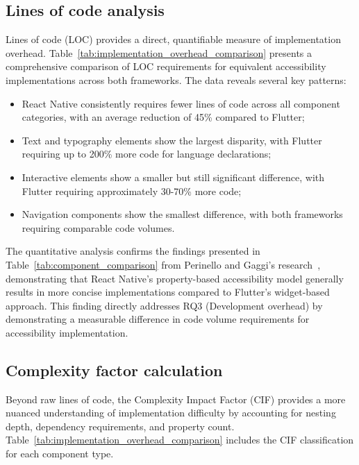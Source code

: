 \subsection{Lines of code analysis}
\label{subsec:loc-analysis}

Lines of code (LOC) provides a direct, quantifiable measure of implementation overhead. Table~\ref{tab:implementation_overhead_comparison} presents a comprehensive comparison of LOC requirements for equivalent accessibility implementations across both frameworks. The data reveals several key patterns:

\begin{itemize}
    \item React Native consistently requires fewer lines of code across all component categories, with an average reduction of 45\% compared to Flutter;
    \item Text and typography elements show the largest disparity, with Flutter requiring up to 200\% more code for language declarations;
    \item Interactive elements show a smaller but still significant difference, with Flutter requiring approximately 30-70\% more code;
    \item Navigation components show the smallest difference, with both frameworks requiring comparable code volumes.
\end{itemize}

The quantitative analysis confirms the findings presented in Table~\ref{tab:component_comparison} from Perinello and Gaggi's research~\cite{perinello2024accessibility}, demonstrating that React Native's property-based accessibility model generally results in more concise implementations compared to Flutter's widget-based approach. This finding directly addresses RQ3 (Development overhead) by demonstrating a measurable difference in code volume requirements for accessibility implementation.

\subsection{Complexity factor calculation}
\label{subsec:complexity-calculation}

Beyond raw lines of code, the Complexity Impact Factor (CIF) provides a more nuanced understanding of implementation difficulty by accounting for nesting depth, dependency requirements, and property count. Table~\ref{tab:implementation_overhead_comparison} includes the CIF classification for each component type.

